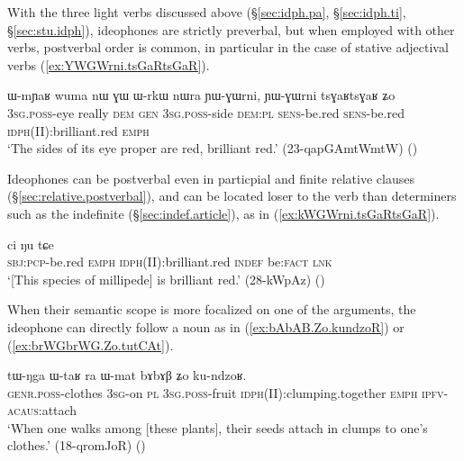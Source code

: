 With the three light verbs discussed above (§\ref{sec:idph.pa}, §\ref{sec:idph.ti}, §\ref{sec:stu.idph}), ideophones are strictly preverbal, but when employed with other verbs, postverbal order is common, in particular in the case of stative adjectival verbs (\ref{ex:YWGWrni.tsGaRtsGaR}).

\begin{exe}
\ex \label{ex:YWGWrni.tsGaRtsGaR}
\gll ɯ-mɲaʁ wuma nɯ ɣɯ ɯ-rkɯ nɯra ɲɯ-ɣɯrni, ɲɯ-ɣɯrni tsɣaʁtsɣaʁ ʑo \\
\textsc{3sg}.\textsc{poss}-eye really \textsc{dem} \textsc{gen} \textsc{3sg}.\textsc{poss}-side \textsc{dem}:\textsc{pl} \textsc{sens}-be.red  \textsc{sens}-be.red \textsc{idph}(II):brilliant.red \textsc{emph} \\
 \glt `The sides of its eye proper are red, brilliant red.'  (23-qapGAmtWmtW) 	()
 \end{exe}

Ideophones can be postverbal even in particpial and finite relative clauses (§\ref{sec:relative.postverbal}), and can be located loser to the verb than determiners such as the indefinite  (§\ref{sec:indef.article}), as in (\ref{ex:kWGWrni.tsGaRtsGaR}).

 \begin{exe}
\ex \label{ex:kWGWrni.tsGaRtsGaR}
 ci ŋu tɕe \\
\textsc{sbj}:\textsc{pcp}-be.red \textsc{emph} \textsc{idph}(II):brilliant.red \textsc{indef} be:\textsc{fact} \textsc{lnk} \\
\glt `[This species of millipede] is brilliant red.' (28-kWpAz)
()
   \end{exe} 
   
 When their semantic scope is more focalized on one of the arguments, the ideophone can directly follow a noun as in (\ref{ex:bAbAB.Zo.kundzoR}) or (\ref{ex:brWGbrWG.Zo.tutCAt}).

\begin{exe}
\ex \label{ex:bAbAB.Zo.kundzoR}
\gll tɯ-ŋga ɯ-taʁ ra ɯ-mat bɤbɤβ ʑo ku-ndzoʁ. \\
\textsc{genr}.\textsc{poss}-clothes \textsc{3sg}-on \textsc{pl}  \textsc{3sg}.\textsc{poss}-fruit \textsc{idph}(II):clumping.together \textsc{emph} \textsc{ipfv}-\textsc{acaus}:attach \\
\glt `When one walks among [these plants], their seeds attach in clumps to one's clothes.' (18-qromJoR)
()
\end{exe}

